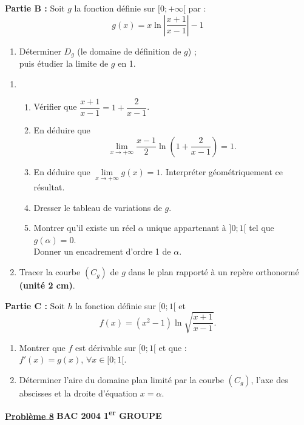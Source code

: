 \documentclass[12pt,a4paper]{article}
\newcommand{\exo}[1]{%
        \textbf{\underline{Problème #1}}
}
\begin{document}
\begin{multicols}{2}
\textbf{Partie B :} Soit \( g \) la fonction définie sur \( [0 ; +\infty[ \) par :
\[
g(x) = x \ln\left| \frac{x+1}{x-1} \right| - 1
\]

\begin{enumerate}
    \item Déterminer \( D_g \) (le domaine de définition de \( g \)) ;\\
    puis étudier la limite de \( g \) en 1.
\end{enumerate}
\begin{enumerate}
    \item
    \begin{enumerate}
        \item Vérifier que \( \dfrac{x+1}{x-1} = 1 + \dfrac{2}{x-1} \).
        \item En déduire que 
        \[
        \lim_{x \to +\infty} \dfrac{x - 1}{2} \ln\left(1 + \dfrac{2}{x - 1} \right) = 1.
        \]
        \item En déduire que \( \lim\limits_{x \to +\infty} g(x) = 1 \). Interpréter géométriquement ce résultat.
        \item Dresser le tableau de variations de \( g \).
        \item Montrer qu’il existe un réel \( \alpha \) unique appartenant à \( ]0 ; 1[ \) tel que \( g(\alpha) = 0 \).\\
        Donner un encadrement d’ordre 1 de \( \alpha \).
    \end{enumerate}

    \item Tracer la courbe \( (C_g) \) de \( g \) dans le plan rapporté à un repère orthonormé \textbf{(unité 2 cm)}.
\end{enumerate}

\textbf{Partie C :} Soit \( h \) la fonction définie sur \( [0 ; 1[ \) et
\[
f(x) = (x^2 - 1) \ln \sqrt{ \dfrac{x+1}{x-1} }.
\]

\begin{enumerate}
    \item Montrer que \( f \) est dérivable sur \( [0 ; 1[ \) et que :\\
    \( f'(x) = g(x) \), \( \forall x \in [0 ; 1[ \).
    
    \item Déterminer l’aire du domaine plan limité par la courbe \( (C_g) \), l’axe des abscisses et la droite d’équation \( x = \alpha \).
\end{enumerate}

\exo{8} \textbf{BAC 2004 1\textsuperscript{er} GROUPE}


\end{multicols}
\end{document}
